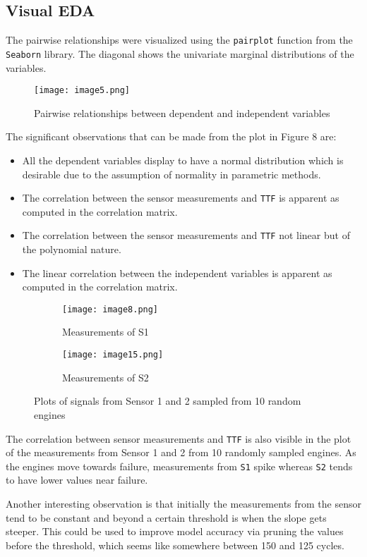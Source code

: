 \documentclass{article}
\begin{document}
\subsection{Visual EDA} \label{sec:visual-eda}
The pairwise relationships were visualized using the \texttt{pairplot} function from the \texttt{Seaborn} library.
The diagonal shows the univariate marginal distributions of the variables.
\begin{figure}[h]
	\centering
	\texttt{[image: image5.png]}
	\caption{Pairwise relationships between dependent and independent variables}
\end{figure}

The significant observations that can be made from the plot in Figure 8 are:
\begin{itemize}
	\item All the dependent variables display to have a normal distribution which is desirable due to the assumption of normality in parametric methods.
	\item The correlation between the sensor measurements and \texttt{TTF} is apparent as computed in the correlation matrix.
	\item The correlation between the sensor measurements and \texttt{TTF} not linear but of the polynomial nature. 
	\item The linear correlation between the independent variables is apparent as computed in the correlation matrix.
\end{itemize}
\begin{figure}[h]
	\begin{subfigure}{.5\textwidth}
		\texttt{[image: image8.png]}
		\caption{Measurements of S1}
		\label{fig:sfig1}
	\end{subfigure}%
	\begin{subfigure}{.5\textwidth}
		\texttt{[image: image15.png]}
		\caption{Measurements of S2}
		\label{fig:sfig2}
	\end{subfigure}
	\caption{Plots of signals from Sensor 1 and 2 sampled from 10 random engines}
	\label{fig:fig}
\end{figure}

The correlation between sensor measurements and \texttt{TTF} is also visible in the plot of the measurements from Sensor 1 and 2 from 10 randomly sampled engines.
As the engines move towards failure, measurements from \texttt{S1} spike whereas \texttt{S2} tends to have lower values near failure.

Another interesting observation is that initially the measurements from the sensor tend to be constant and beyond a certain threshold is when the slope gets steeper.
This could be used to improve model accuracy via pruning the values before the threshold, which seems like somewhere between 150 and 125 cycles.
\end{document}

